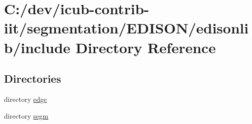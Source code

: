 \section{C\+:/dev/icub-\/contrib-\/iit/segmentation/\+E\+D\+I\+S\+O\+N/edisonlib/include Directory Reference}
\label{dir_023feb6d45b0447fa5ba95b60f5d57f5}
\subsection*{Directories}
\begin{DoxyCompactItemize}
\item 
directory \hyperlink{dir_acf4b6142e7eaba182fb35455cc1d154}{edge}
\item 
directory \hyperlink{dir_1369adde05bf5f0af967fe99b08d4c65}{segm}
\end{DoxyCompactItemize}
